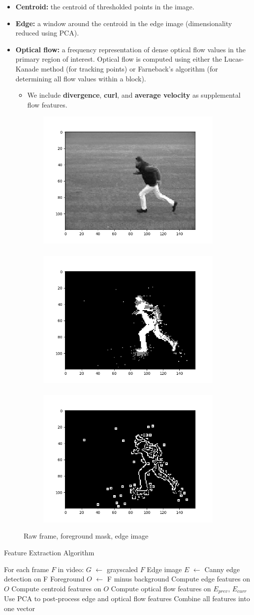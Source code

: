 \documentclass{article}
\begin{document}
\begin{itemize}
    \item \textbf{Centroid:} the centroid of thresholded points in the image.
    \item \textbf{Edge:} a window around the centroid in the edge image (dimensionality reduced using PCA).
    \item \textbf{Optical flow:} a frequency representation of dense optical flow values in the primary region of interest. Optical flow is computed using either the Lucas-Kanade method (for tracking points) or Farneback's algorithm (for determining all flow values within a block).
    \begin{itemize}
        \item We include \textbf{divergence}, \textbf{curl}, and \textbf{average velocity} as supplemental flow features.
    \end{itemize}
\end{itemize}

\begin{figure}[!b]
\centering
\begin{subfigure}[t]{\columnwidth}
\centering
\includegraphics[width=0.3\columnwidth]{frame_gray_1}~
\includegraphics[width=0.3\columnwidth]{fg_mask_1}~
\includegraphics[width=0.3\columnwidth]{edges_1}
\end{subfigure}
\caption{Raw frame, foreground mask, edge image}
\label{fig:images}
\end{figure}

\begin{algorithm}
\caption{Feature Extraction Algorithm}
\begin{algorithmic}[1]
\State For each frame $F$ in video:
    \State \indent $G$ $\leftarrow$ grayscaled $F$
    \State \indent Edge image $E$ $\leftarrow$ Canny edge detection on F
    \State \indent Foreground $O$ $\leftarrow$ F minus background
    \State \indent Compute edge features on $O$
    \State \indent Compute centroid features on $O$
    \State \indent Compute optical flow features on $E_{prev}$, $E_{curr}$
\State Use PCA to post-process edge and optical flow features
\State Combine all features into one vector
\end{algorithmic}
\end{algorithm}
\end{document}
